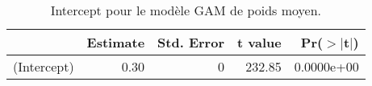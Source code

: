 \begin{table}[!ht]
\centering
\begin{tabular}{rrrrr}
  \hline
 & Estimate & Std. Error & t value & Pr($>$$|$t$|$) \\ 
  \hline
(Intercept) & 0.30 &    0 & 232.85 & 0.0000e+00 \\ 
   \hline
\end{tabular}
\caption{Intercept pour le modèle GAM de poids moyen.} 
\label{smpm.pc}
\end{table}
